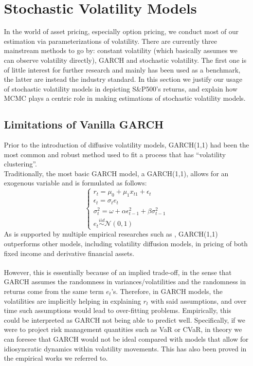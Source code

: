 \documentclass[letterpaper]{article}
\begin{document}
	\section{Stochastic Volatility Models}
	In the world of asset pricing, especially option pricing, we conduct most of our estimation via parameterizations of volatility. There are currently three mainstream methods to go by: constant volatility (which basically assumes we can observe volatility directly), GARCH and stochastic volatility. The first one is of little interest for further research and mainly has been used as a benchmark, the latter are instead the industry standard. In this section we justify our usage of stochastic volatility models in depicting S\&P500's returns, and explain how MCMC plays a centric role in making estimations of stochastic volatility models.
	\subsection{Limitations of Vanilla GARCH}
	Prior to the introduction of diffusive volatility models, GARCH(1,1) had been the most common and robust method used to fit a process that has ``volatility clustering''\cite{hansen2005garch}.\\
	Traditionally, the most basic GARCH model, a GARCH(1,1), allows for an exogenous variable and is formulated as follows:
	\begin{equation}
	\begin{cases}
	r_t=\mu_0+\mu_1x_{t1}+\epsilon_t\\
	\epsilon_t=\sigma_t e_t\\
	\sigma_t^2  = \omega +\alpha\epsilon_{t-1}^2 + \beta\sigma_{t-1}^2\\
	e_t\stackrel{iid}{\sim}\mathcal{N}(0,1) 
	\end{cases}
	\end{equation}
	As is supported by multiple empirical researches such as \cite{lehar2001svgarch}, GARCH(1,1) outperforms other models, including volatility diffusion models, in pricing of both fixed income and derivative financial assets.\\\\
	However, this is essentially because of an implied trade-off, in the sense that GARCH assumes the randomness in variances/volatilities and the randomness in returns come from the same term $e_t$'s. Therefore, in GARCH models, the volatilities are implicitly helping in explaining $r_t$ with said assumptions, and over time such assumptions would lead to over-fitting problems. Empirically, this could be interpreted as GARCH not being able to predict well. Specifically, if we were to project risk management quantities such as VaR or CVaR, in theory we can foresee that GARCH would not be ideal compared with models that allow for idiosyncratic dynamics within volatility movements. This has also been proved in the empirical works we referred to.
\end{document}
